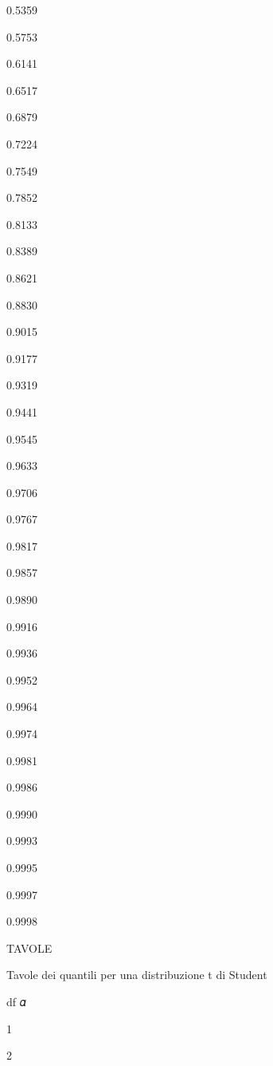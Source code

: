 \documentclass[a4paper,portrait,12pt]{article}
\begin{document}
0.5359


0.5753


0.6141


0.6517


0.6879


0.7224


0.7549


0.7852


0.8133


0.8389


0.8621


0.8830


0.9015


0.9177


0.9319


0.9441


0.9545


0.9633


0.9706


0.9767


0.9817


0.9857


0.9890


0.9916


0.9936


0.9952


0.9964


0.9974


0.9981


0.9986


0.9990


0.9993


0.9995


0.9997


0.9998










\begin{flushleft}
TAVOLE
\end{flushleft}





\begin{flushleft}
Tavole dei quantili per una distribuzione t di Student
\end{flushleft}


\begin{flushleft}
df 𝛼
\end{flushleft}


1


2
\end{document}
